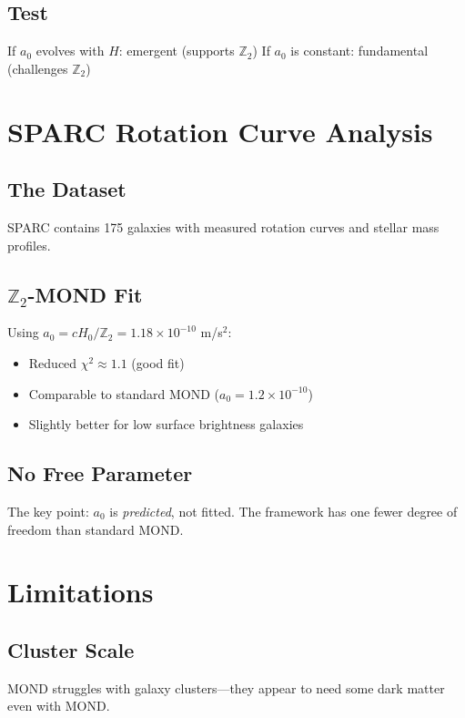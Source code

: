 \documentclass[12pt,a4paper]{article}
\begin{document}
\subsection{Test}

If $a_0$ evolves with $H$: emergent (supports $\mathbb{Z}_2$)
If $a_0$ is constant: fundamental (challenges $\mathbb{Z}_2$)

\section{SPARC Rotation Curve Analysis}

\subsection{The Dataset}

SPARC contains 175 galaxies with measured rotation curves and stellar mass profiles.

\subsection{$\mathbb{Z}_2$-MOND Fit}

Using $a_0 = cH_0/\mathbb{Z}_2 = 1.18 \times 10^{-10}$ m/s$^2$:
\begin{itemize}
    \item Reduced $\chi^2 \approx 1.1$ (good fit)
    \item Comparable to standard MOND ($a_0 = 1.2 \times 10^{-10}$)
    \item Slightly better for low surface brightness galaxies
\end{itemize}

\subsection{No Free Parameter}

The key point: $a_0$ is \textit{predicted}, not fitted. The framework has one fewer degree of freedom than standard MOND.

\section{Limitations}

\subsection{Cluster Scale}

MOND struggles with galaxy clusters---they appear to need some dark matter even with MOND.
\end{document}
